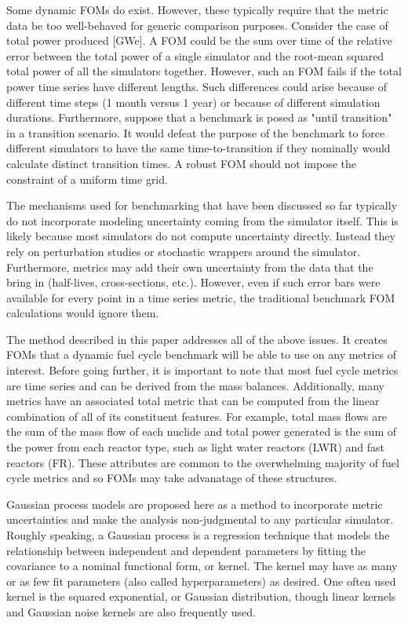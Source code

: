 Some dynamic FOMs do exist. However, these typically require that the metric
data be too well-behaved for generic comparison purposes. Consider the case 
of total power produced [GWe]. A FOM could be the sum over time of the relative error 
between the total power of a single simulator and the root-mean squared total power
of all the simulators together. However, such an FOM fails if the total power
time series have different lengths. Such differences could arise because 
of different time steps (1 month versus 1 year) or because of different 
simulation durations. Furthermore, suppose that a benchmark is posed as 
"until transition" in a transition scenario. It would defeat the purpose of 
the benchmark to force different simulators to have the same 
time-to-transition if they nominally would calculate distinct transition 
times. A robust FOM should not impose the constraint of a uniform time grid.
 
The mechanisms used for benchmarking that have been discussed so far typically
do not incorporate modeling uncertainty coming from the simulator itself.
This is likely because most simulators do not compute uncertainty directly. 
Instead they rely on perturbation studies or stochastic wrappers around 
the simulator. Furthermore, metrics may add their own uncertainty from the 
data that the bring in (half-lives, cross-sections, etc.). 
However, even if such error bars were available for
every point in a time series metric, the traditional benchmark FOM 
calculations would ignore them.

The method described in this paper addresses all of the above issues. It 
creates FOMs that a dynamic fuel cycle benchmark will be able to use on any 
metrics of interest. Before going further, it is important to note that 
most fuel cycle 
metrics are time series and can be derived from the mass balances. 
Additionally, many metrics have an associated total metric that can be 
computed from the linear combination of all of its constituent features. 
For example, total mass flows are the sum of the mass flow of each nuclide
and total power generated is the sum of the power from each reactor type, 
such as light water reactors (LWR) and fast reactors (FR). These attributes 
are common to the overwhelming majority of fuel cycle metrics and so FOMs
may take advanatage of these structures.

Gaussian process models are proposed here as a method to incorporate 
metric uncertainties and make the analysis non-judgmental to any particular 
simulator. Roughly speaking, a Gaussian process is a regression technique
that models the relationship between independent and dependent parameters
by fitting the covariance to a nominal functional form, or kernel.
The kernel may have as many or as few fit parameters (also called 
hyperparameters) as desired. One often used kernel is the squared 
exponential, or Gaussian distribution, though linear kernels and Gaussian
noise kernels are also frequently used. 

